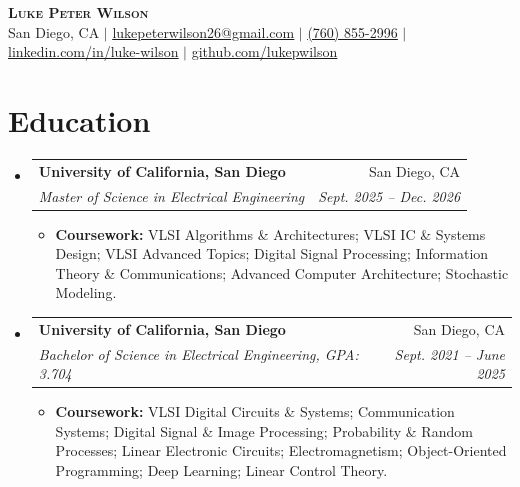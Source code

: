 \documentclass[letterpaper,10pt]{article}
\makeatletter
\newcommand{\resumeItem}[1]{\item \small{#1}}
\newcommand{\resumeSubheading}[4]{
  \vspace{-1pt}\item
    \begin{tabular*}{0.97\textwidth}[t]{l@{\extracolsep{\fill}}r}
      \textbf{#1} & #2 \\
      \textit{\small #3} & \textit{\small #4} \\
    \end{tabular*}\vspace{-6pt}
}
\newcommand{\resumeItemListStart}{\begin{itemize}[leftmargin=0.18in]}
\newcommand{\resumeItemListEnd}{\end{itemize}\vspace{-7pt}}
\newcommand{\resumeSubHeadingListStart}{\begin{itemize}[leftmargin=0.15in, label={}]}
\newcommand{\resumeSubHeadingListEnd}{\end{itemize}\vspace{-6pt}}
\makeatother
\begin{document}
\begin{center}
    \textbf{\Huge \scshape Luke Peter Wilson} \\ \vspace{2pt}
    \small San Diego, CA $|$
    \href{mailto:lukepeterwilson26@gmail.com}{\underline{lukepeterwilson26@gmail.com}} $|$
    \href{tel:+17608552996}{\underline{(760) 855-2996}} $|$
    \href{https://www.linkedin.com/in/luke-wilson-33718b238/}{\underline{linkedin.com/in/luke-wilson}} $|$
    \href{https://github.com/lukepwilson}{\underline{github.com/lukepwilson}}
\end{center}

\section{Education}
\resumeSubHeadingListStart
  \resumeSubheading
    {University of California, San Diego}{San Diego, CA}
    {Master of Science in Electrical Engineering}{Sept. 2025 -- Dec. 2026}
    \resumeItemListStart
      \resumeItem{\textbf{Coursework:} VLSI Algorithms \& Architectures; VLSI IC \& Systems Design; VLSI Advanced Topics; Digital Signal Processing; Information Theory \& Communications; Advanced Computer Architecture; Stochastic Modeling.}
    \resumeItemListEnd

  \resumeSubheading
    {University of California, San Diego}{San Diego, CA}
    {Bachelor of Science in Electrical Engineering, GPA: 3.704}{Sept. 2021 -- June 2025}
    \resumeItemListStart
      \resumeItem{\textbf{Coursework:} VLSI Digital Circuits \& Systems; Communication Systems; Digital Signal \& Image Processing; Probability \& Random Processes; Linear Electronic Circuits; Electromagnetism; Object-Oriented Programming; Deep Learning; Linear Control Theory.}
    \resumeItemListEnd
\resumeSubHeadingListEnd

\end{document}
